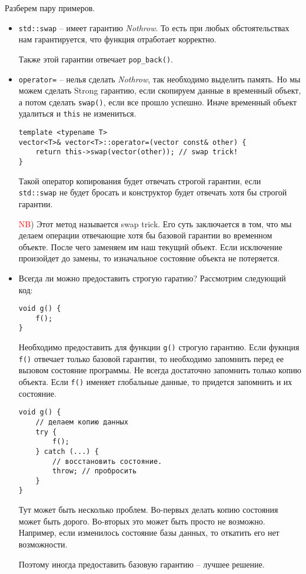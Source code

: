 Разберем пару примеров.
\begin{itemize}
\item \texttt{std::swap} -- имеет гарантию \textit{Nothrow}. То есть при любых обстоятельствах нам гарантируется, что функция отработает корректно.

Также этой гарантии отвечает \texttt{pop_back()}.

\item \texttt{operator=} -- нелья сделать \textit{Nothrow}, так необходимо выделить память. Но мы можем сделать Strong гарантию, если скопируем данные в временный объект, а потом сделать \texttt{swap()}, если все прошло успешно. Иначе временный объект удалиться и \texttt{this} не измениться.
\begin{verbatim}
template <typename T>
vector<T>& vector<T>::operator=(vector const& other) {
    return this->swap(vector(other)); // swap trick!
}
\end{verbatim}
Такой оператор копирования будет отвечать строгой гарантии, если \texttt{std::swap} не будет бросать и конструктор будет отвечать хотя бы строгой гарантии.

\textcolor{red}{NB}) Этот метод называется swap trick. Его суть заключается в том, что мы делаем операции отвечающие хотя бы базовой гарантии во временном объекте. После чего заменяем им наш текущий объект. Если исключение произойдет до замены, то изначальное состояние объекта не потеряется.

\item
Всегда ли можно предоставить строгую гаратию?
Рассмотрим следующий код:
\begin{verbatim}
void g() {
    f();
}
\end{verbatim}
Необходимо предоставить для функции \texttt{g()} строгую гарантию. Если фукнция \texttt{f()} отвечает только базовой гарантии, то необходимо запомнить перед ее вызовом состояние программы. Не всегда достаточно запомнить только копию объекта. Если \texttt{f()} именяет глобальные данные, то придется запомнить и их состояние.
\begin{verbatim}
void g() {
    // делаем копию данных
    try {
        f();
    } catch (...) {
        // восстановить состояние.
        throw; // пробросить
    }
}
\end{verbatim}
Тут может быть несколько проблем. Во-первых делать копию состояния может быть дорого. Во-вторых это может быть просто не возможно. Например, если изменилось состояние базы данных, то откатить его нет возможности.

Поэтому иногда предоставить базовую гарантию -- лучшее решение.
\end{itemize}

